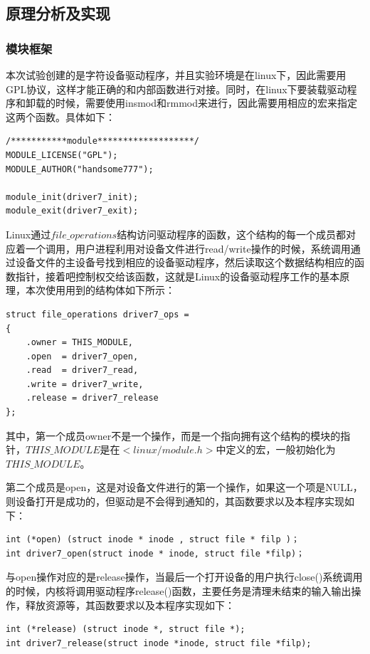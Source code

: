 \documentclass[UTF8]{ctexart}
\begin{document}
\subsection{原理分析及实现}
\subsubsection{模块框架}
本次试验创建的是字符设备驱动程序，并且实验环境是在linux下，因此需要用GPL协议，这样才能正确的和内部函数进行对接。同时，在linux下要装载驱动程序和卸载的时候，需要使用insmod和rmmod来进行，因此需要用相应的宏来指定这两个函数。具体如下：\par

\lstset{language = c}
\begin{lstlisting}
/***********module*******************/
MODULE_LICENSE("GPL");
MODULE_AUTHOR("handsome777");

module_init(driver7_init);
module_exit(driver7_exit);

\end{lstlisting}

Linux通过$file\_operations$结构访问驱动程序的函数，这个结构的每一个成员都对应着一个调用，用户进程利用对设备文件进行read/write操作的时候，系统调用通过设备文件的主设备号找到相应的设备驱动程序，然后读取这个数据结构相应的函数指针，接着吧控制权交给该函数，这就是Linux的设备驱动程序工作的基本原理，本次使用用到的结构体如下所示：\par
\lstset{language = c}
\begin{lstlisting}
struct file_operations driver7_ops = 
{
    .owner = THIS_MODULE,
    .open  = driver7_open,
    .read  = driver7_read,
    .write = driver7_write,
    .release = driver7_release
};
\end{lstlisting}
\par
其中，第一个成员owner不是一个操作，而是一个指向拥有这个结构的模块的指针，$THIS\_MODULE$是在$<linux/module.h>$中定义的宏，一般初始化为$THIS\_MODULE$。\par
第二个成员是open，这是对设备文件进行的第一个操作，如果这一个项是NULL，则设备打开是成功的，但驱动是不会得到通知的，其函数要求以及本程序实现如下：\par
\lstset{language = c}
\begin{lstlisting}
int (*open) (struct inode * inode , struct file * filp )；
int driver7_open(struct inode * inode, struct file *filp)；
\end{lstlisting}
\par
与open操作对应的是release操作，当最后一个打开设备的用户执行close()系统调用的时候，内核将调用驱动程序release()函数，主要任务是清理未结束的输入输出操作，释放资源等，其函数要求以及本程序实现如下：\par
\lstset{language = c}
\begin{lstlisting}
int (*release) (struct inode *, struct file *);
int driver7_release(struct inode *inode, struct file *filp);
\end{lstlisting}
\end{document}
